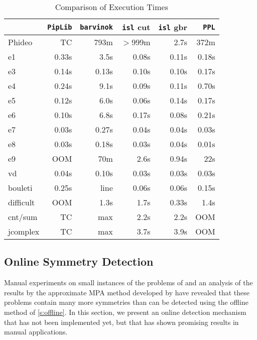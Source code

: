 \begin{table}
\begin{center}
\begin{tabular}{lrrrrr}
    & {\tt PipLib} & {\tt barvinok} & {\tt isl} cut & {\tt isl} gbr & {\tt PPL} \\
\hline
\hline
Phideo & TC    & 793m   & $>$999m &   2.7s  & 372m \\
\hline
e1 & 0.33s & 3.5s & 0.08s & 0.11s & 0.18s \\
e3 & 0.14s & 0.13s & 0.10s & 0.10s & 0.17s \\
e4 & 0.24s & 9.1s & 0.09s & 0.11s & 0.70s \\
e5 & 0.12s & 6.0s & 0.06s & 0.14s & 0.17s \\
e6 & 0.10s & 6.8s & 0.17s & 0.08s & 0.21s \\
e7 & 0.03s & 0.27s & 0.04s & 0.04s & 0.03s \\
e8 & 0.03s & 0.18s & 0.03s & 0.04s & 0.01s \\
e9 & OOM & 70m & 2.6s & 0.94s & 22s \\
vd & 0.04s & 0.10s & 0.03s & 0.03s & 0.03s \\
bouleti & 0.25s & line & 0.06s & 0.06s & 0.15s \\
difficult & OOM & 1.3s & 1.7s & 0.33s & 1.4s \\
\hline
cnt/sum & TC & max & 2.2s & 2.2s & OOM \\
jcomplex & TC & max & 3.7s & 3.9s & OOM \\
\end{tabular}
\caption{Comparison of Execution Times}
\label{t:comparison}
\end{center}
\end{table}

\subsection{Online Symmetry Detection}\label{s:online}

Manual experiments on small instances of the problems of
\textcite{Bygde2010licentiate} and an analysis of the results
by the approximate MPA method developed by \textcite{Bygde2010licentiate}
have revealed that these problems contain many more symmetries
than can be detected using the offline method of \autoref{s:offline}.
In this section, we present an online detection mechanism that has
not been implemented yet, but that has shown promising results
in manual applications.

